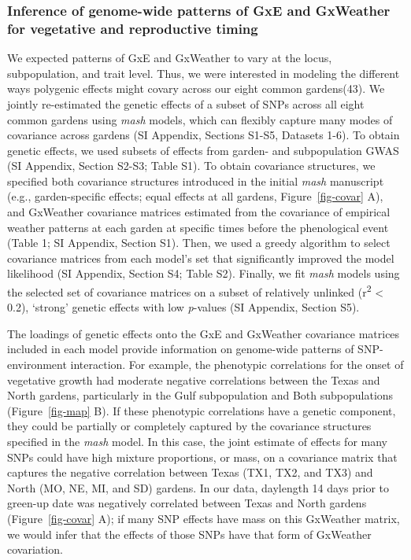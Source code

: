 \documentclass[
  9pt,
  twocolumn,
  twoside]{pnas-new}
\begin{document}
\subsubsection{Inference of genome-wide patterns of GxE and GxWeather
for vegetative and reproductive
timing}\label{inference-of-genome-wide-patterns-of-gxe-and-gxweather-for-vegetative-and-reproductive-timing}

We expected patterns of GxE and GxWeather to vary at the locus,
subpopulation, and trait level. Thus, we were interested in modeling the
different ways polygenic effects might covary across our eight common
gardens(43). We jointly re-estimated the genetic effects of a subset of
SNPs across all eight common gardens using \emph{mash} models, which can
flexibly capture many modes of covariance across gardens (SI Appendix,
Sections S1-S5, Datasets 1-6). To obtain genetic effects, we used
subsets of effects from garden- and subpopulation GWAS (SI Appendix,
Section S2-S3; Table S1). To obtain covariance structures, we specified
both covariance structures introduced in the initial \emph{mash}
manuscript (e.g., garden-specific effects; equal effects at all gardens,
Figure~\ref{fig-covar} A), and GxWeather covariance matrices estimated
from the covariance of empirical weather patterns at each garden at
specific times before the phenological event (Table 1; SI Appendix,
Section S1). Then, we used a greedy algorithm to select covariance
matrices from each model's set that significantly improved the model
likelihood (SI Appendix, Section S4; Table S2). Finally, we fit
\emph{mash} models using the selected set of covariance matrices on a
subset of relatively unlinked (r\textsuperscript{2} \textless{} 0.2),
`strong' genetic effects with low \emph{p}-values (SI Appendix, Section
S5).

The loadings of genetic effects onto the GxE and GxWeather covariance
matrices included in each model provide information on genome-wide
patterns of SNP-environment interaction. For example, the phenotypic
correlations for the onset of vegetative growth had moderate negative
correlations between the Texas and North gardens, particularly in the
Gulf subpopulation and Both subpopulations (Figure~\ref{fig-map} B). If
these phenotypic correlations have a genetic component, they could be
partially or completely captured by the covariance structures specified
in the \emph{mash} model. In this case, the joint estimate of effects
for many SNPs could have high mixture proportions, or mass, on a
covariance matrix that captures the negative correlation between Texas
(TX1, TX2, and TX3) and North (MO, NE, MI, and SD) gardens. In our data,
daylength 14 days prior to green-up date was negatively correlated
between Texas and North gardens (Figure~\ref{fig-covar} A); if many SNP
effects have mass on this GxWeather matrix, we would infer that the
effects of those SNPs have that form of GxWeather covariation.
\end{document}
